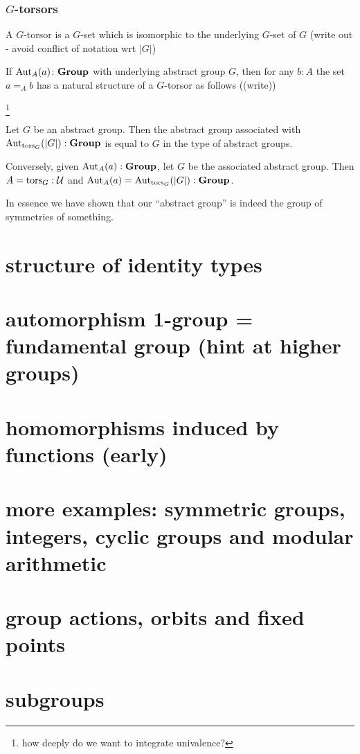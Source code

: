 \subsubsection{$G$-torsors}
\label{sec:Gtorsors}
\begin{definition}
  A $G$-torsor is a $G$-set which is isomorphic to the underlying $G$-set of $G$ (write out - avoid conflict of notation wrt $|G|$)
\end{definition}
\begin{example}
  If $\mathrm{Aut}_A(a)\colon\mathbf{Group}$ with underlying abstract group $G$, then for any $b:A$ the set $a=_Ab$ has a natural structure of a $G$-torsor as follows ((write))
\end{example}

\footnote{how deeply do we want to integrate univalence?}
\begin{lemma}
  \label{lem:Groupsareidentitytypes}Let $G$ be an abstract group.  Then the abstract group associated with $\mathrm{Aut}_{\mathrm{tors}_G}(|G|):\mathbf{Group}$ is equal to $G$ in the type of abstract groups.

Conversely, given $\mathrm{Aut}_A(a):\mathbf{Group}$, let $G$ be the associated abstract group.  Then $A=\mathrm{tors}_G:\mathcal U$ and $\mathrm{Aut}_A(a)=\mathrm{Aut}_{\mathrm{tors}_G}(|G|):\mathbf{Group}$.
\end{lemma}
In essence we have shown that our ``abstract group'' is indeed the group of symmetries of something.

\section{structure of identity types}
\section{automorphism 1-group = fundamental group (hint at higher groups)}
\section{homomorphisms induced by functions (early)}
\section{more examples: symmetric groups, integers, cyclic groups and modular arithmetic}
\section{group actions, orbits and fixed points}
\section{subgroups}
